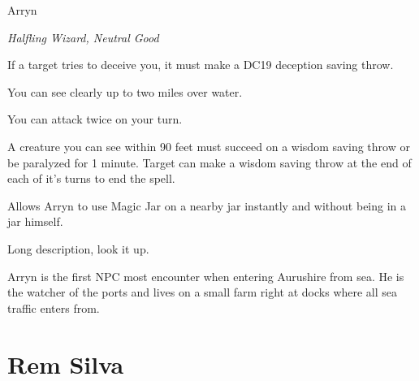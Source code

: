 \documentclass[letterpaper,10pt,twoside,twocolumn,openany]{book}
\begin{document}
\begin{monsterbox}{Arryn}
	\begin{hangingpar}
		\textit{Halfling Wizard, Neutral Good}
	\end{hangingpar}
	\dndline%
	\basics[%
	armorclass = 17,
	hitpoints  = 172,
	speed      = 40 ft
	]
	\dndline%
	\stats[
	STR = \stat{12}, %
	DEX = \stat{12},
	CON = \stat{16},
	INT = \stat{20},
	WIS = \stat{18},
	CHA = \stat{18}
	]
	\dndline%
	\details[%
	languages = {Common, Elvish, Dwarvish, Gnomish, Halfling, Orc, Pandaren},
	]
	\dndline%
	\begin{monsteraction}
		If a target tries to deceive you, it must make a DC19 deception saving throw.
	\end{monsteraction}	
	\begin{monsteraction}
		You can see clearly up to two miles over water.
	\end{monsteraction}
	\begin{monsteraction}
		You can attack twice on your turn.
	\end{monsteraction}
	\begin{monsteraction}
		A creature you can see within 90 feet must succeed on a wisdom saving throw or be paralyzed for 1 minute. Target can make a wisdom saving throw at the end of each of it's turns to end the spell.
	\end{monsteraction}
	\begin{monsteraction}
		Allows Arryn to use Magic Jar on a nearby jar instantly and without being in a jar himself.
	\end{monsteraction}
	\begin{monsteraction}
		Long description, look it up.
	\end{monsteraction}
	Arryn is the first NPC most encounter when entering Aurushire from sea. He is the watcher of the ports and lives on a small farm right at docks where all sea traffic enters from.
\end{monsterbox}

\section{Rem Silva}
\end{document}
